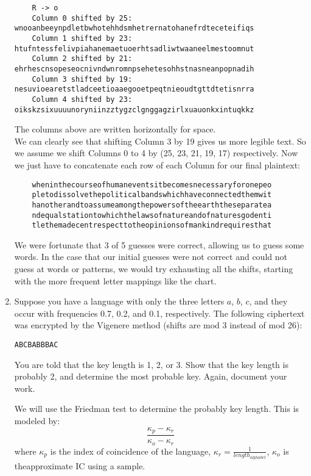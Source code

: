 \documentclass[10pt,letterpaper]{report}
\begin{document}
\begin{enumerate}
\begin{verbatim}
	R -> o
	Column 0 shifted by 25: wnooanbeeynpdletbwhotehhdsmhetrernatohanefrdteceteifiqs
	Column 1 shifted by 23: htufntessfelivpiahanemaetuoerhtsadliwtwaaneelmestoomnut
	Column 2 shifted by 21: ehrhescnsopeseocnivndwnromnpsehetesohhstnasneanpopnadih
	Column 3 shifted by 19: nesuvioearetstladceetioaaegooetpeqtnieoudtgttdtetisnrra
	Column 4 shifted by 23: oikskzsixuuuunoryniinzztygzclgnggagzirlxuauonkxintuqkkz
	\end{verbatim}
	The columns above are written horizontally for space.\\
	We can clearly see that shifting Column 3 by 19 gives us more legible text. So
	we assume we shift Columns 0 to 4 by (25, 23, 21, 19, 17) respectively. Now we
	just have to concatenate each row of each Column for our final plaintext:
	
	\begin{verbatim}
	wheninthecourseofhumaneventsitbecomesnecessaryforonepeo
	pletodissolvethepoliticalbandswhichhaveconnectedthemwit
	hanotherandtoassumeamongthepowersoftheearththeseparatea
	ndequalstationtowhichthelawsofnatureandofnaturesgodenti
	tlethemadecentrespecttotheopinionsofmankindrequiresthat
	\end{verbatim}

	We were fortunate that 3 of 5 guesses were correct, allowing us to guess some words.
	In the case that our initial guesses were not correct and could not guess at
	words or patterns, we would try exhausting all the shifts, starting with the
	more frequent letter mappings like the chart.
	\\
	
	
	
	\item Suppose you have a language with only the three letters $a$, $b$, $c$, and
	they occur with frequencies 0.7, 0.2, and 0.1, respectively. The following ciphertext
	was encrypted by the Vigenere method (shifts are mod 3 instead of mod 26):
	
	\begin{center}
	\verb|ABCBABBBAC|
	\end{center}
	
	You are told that the key length is 1, 2, or 3. Show that the key length is
	probably 2, and determine the most probable key.
	Again, document your work.
	\par
	We will use the Friedman test to determine the probably key length. This is modeled
	by:
	$$ \frac{\kappa_p - \kappa_r}{\kappa_o - \kappa_r} $$
	where $\kappa_p$ is the index of coincidence of the language, $\kappa_r = \frac{1}{length_{alphabet}}$, $\kappa_o$ is theapproximate IC using a sample.
	

\end{enumerate}
\end{document}
